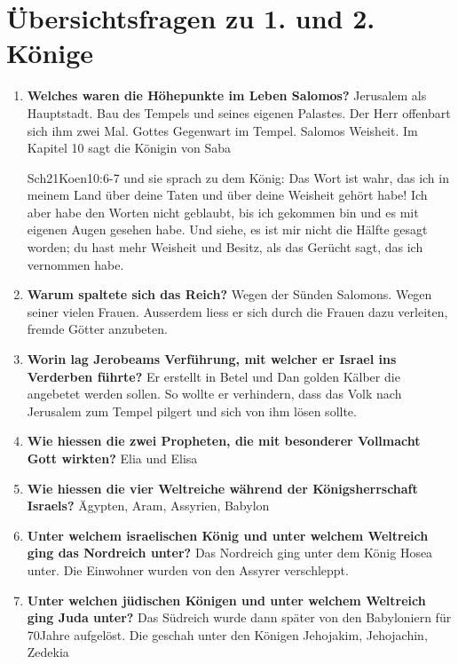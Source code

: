 \section{Übersichtsfragen zu 1. und 2. Könige}
\begin{enumerate}
    \item \textbf{Welches waren die Höhepunkte im Leben Salomos?}
    Jerusalem als Hauptstadt. Bau des Tempels und seines eigenen Palastes. Der Herr offenbart sich ihm zwei Mal. Gottes Gegenwart im Tempel. Salomos Weisheit. Im Kapitel 10 sagt die Königin von Saba
    \begin{bibeltext}{Sch2}{1Koen}{10:6-7}
        und sie sprach zu dem König: Das Wort ist wahr, das ich in meinem Land über deine Taten und über deine Weisheit gehört habe! Ich aber habe den Worten nicht geblaubt, bis ich gekommen bin und es mit eigenen Augen gesehen habe. Und siehe, es ist mir nicht die Hälfte gesagt worden; du hast mehr Weisheit und Besitz, als das Gerücht sagt, das ich vernommen habe.
    \end{bibeltext}
    \item \textbf{Warum spaltete sich das Reich?}
    Wegen der Sünden Salomons. Wegen seiner vielen Frauen. Ausserdem liess er sich durch die Frauen dazu verleiten, fremde Götter anzubeten.
    \item \textbf{Worin lag Jerobeams Verführung, mit welcher er Israel ins Verderben führte?}
    Er erstellt in Betel und Dan golden Kälber die angebetet werden sollen. So wollte er verhindern, dass das Volk nach Jerusalem zum Tempel pilgert und sich von ihm lösen sollte.
    \item \textbf{Wie hiessen die zwei Propheten, die mit besonderer Vollmacht Gott wirkten?}
    Elia und Elisa
    \item \textbf{Wie hiessen die vier Weltreiche während der Königsherrschaft Israels?}
    Ägypten, Aram, Assyrien, Babylon
    \item \textbf{Unter welchem israelischen König und unter welchem Weltreich ging das Nordreich unter?}
    Das Nordreich ging unter dem König Hosea unter. Die Einwohner wurden von den Assyrer verschleppt.
    \item \textbf{Unter welchen jüdischen Königen und unter welchem Weltreich ging Juda unter? }
    Das Südreich wurde dann später von den Babyloniern für 70Jahre aufgelöst. Die geschah unter den Königen Jehojakim, Jehojachin, Zedekia
\end{enumerate}